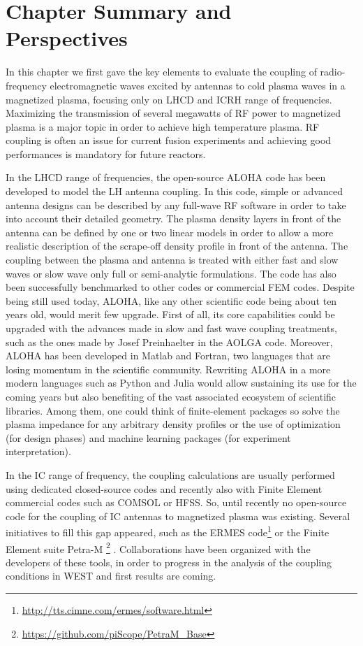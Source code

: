 \section{Chapter Summary and Perspectives}
In this chapter we first gave the key elements to evaluate the coupling of radio-frequency electromagnetic waves excited by antennas to cold plasma waves in a magnetized plasma, focusing only on LHCD and ICRH range of frequencies. Maximizing the transmission of several megawatts of RF power to magnetized plasma is a major topic in order to achieve high temperature plasma. RF coupling is often an issue for current fusion experiments and achieving good performances is mandatory for future reactors.


In the LHCD range of frequencies, the open-source ALOHA code has been developed to model the LH antenna coupling. In this code, simple or advanced antenna designs can be described by any full-wave RF software in order to take into account their detailed geometry. The plasma density layers in front of the antenna can be defined by one or two linear models in order to allow a more realistic description of the scrape-off density profile in front of the antenna. The coupling between the plasma and antenna is treated with either fast and slow waves or slow wave only full or semi-analytic formulations. The code has also been successfully benchmarked to other codes or commercial FEM codes. Despite being still used today, ALOHA, like any other scientific code being about ten years old, would merit few upgrade. First of all, its core capabilities could be upgraded with the advances made in slow and fast wave coupling treatments, such as the ones made by Josef Preinhaelter in the AOLGA code. Moreover, ALOHA has been developed in Matlab and Fortran, two languages that are losing momentum in the scientific community. Rewriting ALOHA in a more modern languages such as Python and Julia would allow sustaining its use for the coming years but also benefiting of the vast associated ecosystem of scientific libraries. Among them, one could think of finite-element packages so solve the plasma impedance for any arbitrary density profiles or the use of optimization (for design phases) and machine learning packages (for experiment interpretation).


In the IC range of frequency, the coupling calculations are usually performed using dedicated closed-source codes and recently also with Finite Element commercial codes such as COMSOL or HFSS. So, until recently no open-source code for the coupling of IC antennas to magnetized plasma was existing. Several initiatives to fill this gap appeared, such as the ERMES code\footnote{\url{http://tts.cimne.com/ermes/software.html}}  or the Finite Element suite Petra-M \footnote{\url{https://github.com/piScope/PetraM_Base}} . Collaborations have been organized with the developers of these tools, in order to progress in the analysis of the coupling conditions in WEST and first results are coming. 


